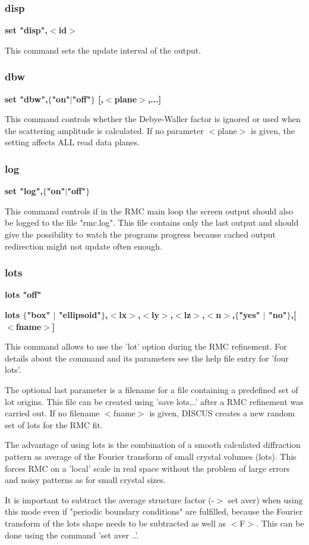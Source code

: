 \subsubsection{disp}
{\bf set "disp",$ <$id$> $ \par }
\par
\vspace{3pt}
This command sets the update interval of the output. 
\subsubsection{dbw}
{\bf set "dbw",$ \{$"on"$| $"off"$\} $ [,$ <$plane$> $,...] \par }
\par
\vspace{3pt}
This command controls whether the Debye-Waller factor is ignored or 
used when the scattering amplitude is calculated. If no parameter 
$ <$plane$> $ is given, the setting affects ALL read data planes. 
\subsubsection{log}
{\bf set "log",$ \{$"on"$| $"off"$\} $ \par }
\par
\vspace{3pt}
This command controls if in the RMC main loop the screen output should 
also be logged to the file "rmc.log". This file contains only the last 
output and should give the possibility to watch the programs progress 
because cached output redirection might not update often enough. 
\subsubsection{lots}
{\bf lots "off" \par }
{\bf lots $ \{$"box" $| $ "ellipsoid"$\} $,$ <$lx$> $,$ <$ly$> $,$ <$lz$> $,$ <$n$> $,$ \{$"yes" $| $ "no"$\} $,[$ <$fname$> $] \par }
\par
\vspace{3pt}
This command allows to use the 'lot' option during the RMC refinement. 
For details about the command and its parameters see the help file 
entry for 'four lots'. 
\par
The optional last parameter is a filename for a file containing a 
predefined set of lot origins. This file can be created using 
'save lots,..' after a RMC refinement was carried out. If no 
filename $ <$fname$> $ is given, DISCUS creates a new random set of 
lots for the RMC fit. 
\par
The advantage of using lots is the combination of a smooth calculated 
diffraction pattern as average of the Fourier transform of small 
crystal volumes (lots). This forces RMC on a 'local' scale in real 
space without the problem of large errors and noisy patterns as for 
small crystal sizes. 
\par
It is important to subtract the average structure factor (-$> $ set aver) 
when using this mode even if "periodic boundary conditions" are 
fulfilled, because the Fourier transform of the lots shape needs to 
be subtracted as well as $ <$F$> $. This can be done using the command 
'set aver ..'. 

